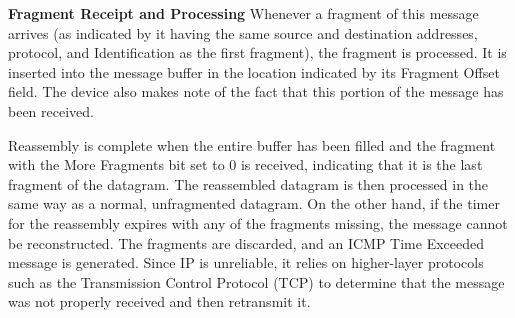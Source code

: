{\textbf{Fragment Receipt and Processing}} Whenever a fragment of this
message arrives (as indicated by it having the same source and
destination addresses, protocol, and Identification as the first
fragment), the fragment is processed. It is inserted into the message
buffer in the location indicated by its Fragment Offset field. The
device also makes note of the fact that this portion of the message has
been received.

Reassembly is complete when the entire buffer has been filled and the
fragment with the More Fragments bit set to 0 is received, indicating
that it is the last fragment of the datagram. The reassembled datagram
is then processed in the same way as a normal, unfragmented datagram. On
the other hand, if the timer for the reassembly expires with any of the
fragments missing, the message cannot be reconstructed. The fragments
are discarded, and an ICMP Time Exceeded message is generated. Since IP
is unreliable, it relies on higher-layer protocols such as the
Transmission Control Protocol (TCP) to determine that the message was
not properly received and then retransmit it.

